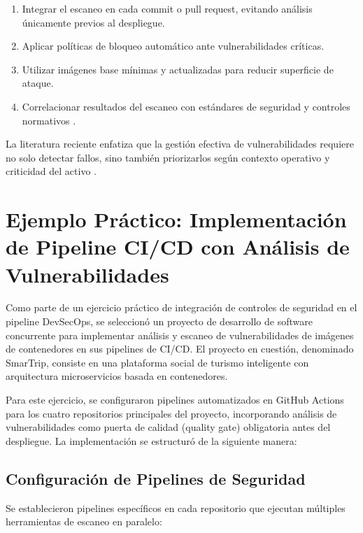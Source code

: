 \documentclass[journal]{IEEEtran}
\begin{document}
\begin{enumerate}
    \item Integrar el escaneo en cada commit o pull request, evitando análisis únicamente previos al despliegue.

    \item Aplicar políticas de bloqueo automático ante vulnerabilidades críticas.

    \item Utilizar imágenes base mínimas y actualizadas para reducir superficie de ataque.

    \item Correlacionar resultados del escaneo con estándares de seguridad y controles normativos \cite{ref1}.
\end{enumerate}

La literatura reciente enfatiza que la gestión efectiva de vulnerabilidades requiere no solo detectar fallos, sino también priorizarlos según contexto operativo y criticidad del activo \cite{ref3}. 

\section{Ejemplo Práctico: Implementación de Pipeline CI/CD con Análisis de Vulnerabilidades}

Como parte de un ejercicio práctico de integración de controles de seguridad en el pipeline DevSecOps, se seleccionó un proyecto de desarrollo de software concurrente para implementar análisis y escaneo de vulnerabilidades de imágenes de contenedores en sus pipelines de CI/CD. El proyecto en cuestión, denominado SmarTrip, consiste en una plataforma social de turismo inteligente con arquitectura microservicios basada en contenedores.

Para este ejercicio, se configuraron pipelines automatizados en GitHub Actions para los cuatro repositorios principales del proyecto, incorporando análisis de vulnerabilidades como puerta de calidad (quality gate) obligatoria antes del despliegue. La implementación se estructuró de la siguiente manera:

\subsection{Configuración de Pipelines de Seguridad}

Se establecieron pipelines específicos en cada repositorio que ejecutan múltiples herramientas de escaneo en paralelo:
\end{document}
